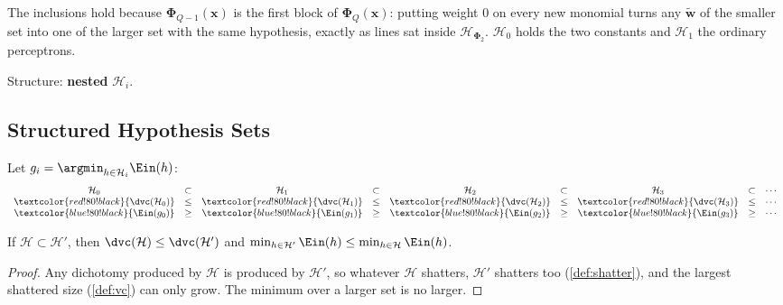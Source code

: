 \begin{center}
    \nestedH
\end{center}

The inclusions hold because \(\bm{\Phi}_{Q-1}(\bm{x})\) is the first block of
\(\bm{\Phi}_Q(\bm{x})\): putting weight \(0\) on every new monomial turns any
\(\tilde{\bm{w}}\) of the smaller set into one of the larger set with the same
hypothesis, exactly as lines sat inside \(\mathcal{H}_{\bm{\Phi}_2}\).
\(\mathcal{H}_0\) holds the two constants and \(\mathcal{H}_1\) the ordinary
perceptrons.

\begin{moral}
    Structure: \textbf{nested} \(\mathcal{H}_i\).
\end{moral}

\subsection{Structured Hypothesis Sets}

\begin{center}
    \nestedH
\end{center}

Let \(g_i = \argmin_{h \in \mathcal{H}_i} \Ein(h)\):
\[
    \begin{array}{ccccccccc}
        \mathcal{H}_0 & \subset & \mathcal{H}_1 & \subset & \mathcal{H}_2 &
        \subset & \mathcal{H}_3 & \subset & \cdots\\
        \textcolor{red!80!black}{\dvc(\mathcal{H}_0)} & \le &
        \textcolor{red!80!black}{\dvc(\mathcal{H}_1)} & \le &
        \textcolor{red!80!black}{\dvc(\mathcal{H}_2)} & \le &
        \textcolor{red!80!black}{\dvc(\mathcal{H}_3)} & \le & \cdots\\
        \textcolor{blue!80!black}{\Ein(g_0)} & \ge &
        \textcolor{blue!80!black}{\Ein(g_1)} & \ge &
        \textcolor{blue!80!black}{\Ein(g_2)} & \ge &
        \textcolor{blue!80!black}{\Ein(g_3)} & \ge & \cdots
    \end{array}
\]

\begin{proposition}\label{prop:nested}
    If \(\mathcal{H} \subset \mathcal{H}'\), then \(\dvc(\mathcal{H}) \le
    \dvc(\mathcal{H}')\) and \(\min_{h \in \mathcal{H}'} \Ein(h) \le \min_{h
    \in \mathcal{H}} \Ein(h)\).
\end{proposition}

\begin{proof}
    Any dichotomy produced by \(\mathcal{H}\) is produced by
    \(\mathcal{H}'\), so whatever \(\mathcal{H}\) shatters, \(\mathcal{H}'\)
    shatters too (\autoref{def:shatter}), and the largest shattered size
    (\autoref{def:vc}) can only grow. The minimum over a larger set is no
    larger.
\end{proof}

